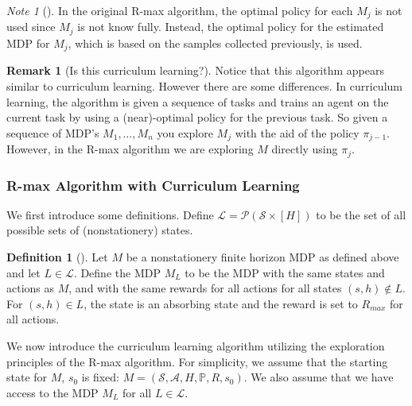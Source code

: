 \documentclass[12pt, letterpaper]{article}
\theoremstyle{definition}
\newtheorem*{defn}{Definition}
\newtheorem*{rmk}{Remark}
\theoremstyle{remark}
\newtheorem*{note}{Note}
\begin{document}
\begin{note}[]
    \color{red}
    In the original R-max algorithm, the optimal policy for each \(M_j\) is not used since \(M_j\) is not know fully. Instead, the optimal policy for the estimated MDP for \(M_j\), which is based on the samples collected previously, is used.
\end{note}

\begin{rmk}[Is this curriculum learning?]
    Notice that this algorithm appears similar to curriculum learning. However there are some differences. In curriculum learning, the algorithm is given a sequence of tasks and trains an agent on the current task by using a (near)-optimal policy for the previous task. So given a sequence of MDP's \(M_1, \ldots, M_n\) you explore \(M_j\) with the aid of the policy \(\pi_{j-1}\). However, in the R-max algorithm we are exploring \(M\) directly using \(\pi_j\).
\end{rmk}

\subsubsection{R-max Algorithm with Curriculum Learning}

We first introduce some definitions. Define \(\mathcal{L} = \mathcal{P}(\mathcal{S} \times [H])\) to be the set of all possible sets of (nonstationery) states.

\begin{defn}[]
    Let \(M\) be a nonstationery finite horizon MDP as defined above and let \(L \in \mathcal{L}\). Define the MDP \underline{\(M_L\)} to be the MDP with the same states and actions as \(M\), and with the same rewards for all actions for all states \((s, h) \notin L\). For \((s, h) \in L\), the state is an absorbing state and the reward is set to \(R_{max}\) for all actions.
\end{defn}

We now introduce the curriculum learning algorithm utilizing the exploration principles of the R-max algorithm. For simplicity, we assume that the starting state for \(M\), \(s_0\) is fixed: \(M = (\mathcal{S}, \mathcal{A}, H, \mathbb{P}, R, s_0)\). We also assume that we have access to the MDP \(M_L\) for all \(L \in \mathcal{L}\).
\end{document}
